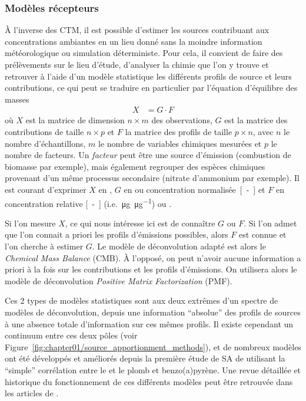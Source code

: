 \subsubsection{Modèles récepteurs}%
\label{ssub:model_recepteur}

À l'inverse des CTM, il est possible d'estimer les sources contribuant aux concentrations
ambiantes en un lieu donné sans la moindre information météorologique ou simulation
déterministe. Pour cela, il convient de faire des prélèvements sur le lieu d'étude,
d'analyser la chimie que l'on y trouve et retrouver à l'aide d'un modèle statistique
les différents profils de source et leurs contributions, ce qui peut se traduire en
particulier par l'équation d'équilibre des masses
\begin{align}
    \label{eq:mass_balance}
    X &= G \cdot F
\end{align}
où $X$ est la matrice de dimension $n\times m$ des observations, $G$ est la matrice des
contributions de taille $n\times p$ et $F$ la matrice des profils de taille $p \times n$,
avec $n$ le nombre d'échantillons, $m$ le nombre de variables chimiques mesurées et $p$ le
nombre de facteurs.
Un \textit{facteur} peut être une source d'émission (combustion de biomasse par exemple),
mais également regrouper des espèces chimiques provenant d'un même processus secondaire
(nitrate d'ammonium par exemple).
Il est courant d'exprimer $X$ en \si{\ugm}, $G$ en \si{\ugm} ou concentration
normalisée~\si{[-]} et $F$ en concentration relative \si{[-]}
(i.e.~\si{\micro\g\per\micro\g}) ou \si{\ugm}.

Si l'on mesure $X$, ce qui nous intéresse ici est de connaître $G$ ou $F$.
Si l'on admet que l'on connait a priori les profils d'émissions possibles, alors $F$ est
connue et l'on cherche à estimer $G$. Le modèle de déconvolution adapté est alors le
\textit{Chemical Mass Balance} (CMB). À l'opposé, on peut n'avoir aucune information a
priori à la fois sur les contributions et les profils d'émissions. On utilisera alors le
modèle de déconvolution \textit{Positive Matrix Factorization} (PMF).

Ces 2 types de modèles statistiques sont aux deux extrêmes d'un spectre de modèles de
déconvolution, depuis une information ``absolue'' des profils de sources à une absence
totale d'information sur ces mêmes profils.  Il existe cependant un continuum entre ces
deux pôles (voir Figure~\ref{fig:chapter01/source_apportionment_methods}), et de nombreux
modèles ont été développés et améliorés depuis la première étude de SA de
\cite{colucciAutomotive1965} utilisant la ``simple'' corrélation entre le  et
le plomb et benzo(a)pyrène.  Une revue détaillée et historique du fonctionnement de ces
différents modèles peut être retrouvée dans les articles de
\cite{henryHistory1997,vianaSource2008,belisCritical2013,hopkeReview2016}.

